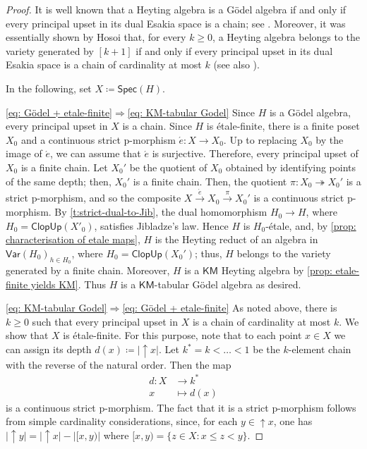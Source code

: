 \documentclass[12pt]{amsart}
\theoremstyle{plain}
\theoremstyle{definition}
\newcommand{\KM}{\mathsf{KM}}
\newcommand{\Spec}{\mathsf{Spec}}
\newcommand{\ClopUp}{\mathsf{ClopUp}}
\begin{document}
\begin{proof}
    It is well known that a Heyting algebra is a Gödel algebra if and only if every principal upset in its dual Esakia space is a chain; see \cite[Thm.~1.5]{hornlinearheyting}.
    Moreover, it was essentially shown by Hosoi \cite{Hosoi1967-HOSOIL-2} that, for every $k\geq 0$, a Heyting algebra belongs to the variety generated by $[k+1]$ if and only if every principal upset in its dual Esakia space is a chain of cardinality at most $k$ (see also \cite{Dunn1971}).

    In the following, set $X \coloneqq \Spec(H)$.

    \eqref{eq: Gödel + etale-finite}$\Rightarrow$\eqref{eq: KM-tabular Godel} Since $H$ is a Gödel algebra, every principal upset in $X$ is a chain. Since $H$ is étale-finite, there is a finite poset $X_{0}$ and a continuous strict p-morphism $\acute{e}\colon X\to X_{0}$.
    Up to replacing $X_0$ by the image of $\acute{e}$, we can assume that $\acute{e}$ is surjective.
    Therefore, every principal upset of $X_0$ is a finite chain.
    Let $X_0'$ be the quotient of $X_0$ obtained by identifying points of the same depth; then, $X_0'$ is a finite chain.
    Then, the quotient $\pi \colon X_0 \twoheadrightarrow X_0'$ is a strict p-morphism, and so the composite $X \xrightarrow{\acute{e}}X_0 \xrightarrow{\pi} X_0'$ is a continuous strict p-morphism.
    By \cref{t:strict-dual-to-Jib}, the dual homomorphism
    \(H_0\to H\), where $H_0 =\ClopUp(X'_0)$, satisfies Jibladze's law. Hence $H$ is
    $H_0$-étale, and, by \cref{prop: characterisation of etale maps}, $H$ is the Heyting reduct of an algebra in $\mathsf{Var}(H_{0})_{h\in H_0}$, where $H_{0}=\ClopUp(X_{0}')$; thus, $H$ belongs to the variety generated by a finite chain.  Moreover, $H$ is a $\KM$ Heyting algebra by \cref{prop: etale-finite yields KM}. Thus $H$ is a $\KM$-tabular Gödel algebra as desired.
    
    \eqref{eq: KM-tabular Godel}$\Rightarrow$\eqref{eq: Gödel + etale-finite} As noted above, there is $k \geq 0$ such that every principal upset in $X$ is a chain of cardinality at most $k$. We show that $X$ is étale-finite. For this purpose, note that to each point $x\in X$ we can assign its depth $d(x) \coloneqq \lvert {\uparrow}x\rvert$. Let $k^{*}=k<\dots<1$ be the $k$-element chain with the reverse of the natural order. Then the map
    \begin{align*}
        d\colon X&\longrightarrow k^{*}\\
        x&\longmapsto d(x)
    \end{align*}
    is a continuous strict p-morphism. The fact that it is a strict p-morphism follows from simple cardinality considerations, since, for each $y\in {\uparrow}x$, one has $\lvert{\uparrow}y\rvert=\lvert{\uparrow}x\rvert-\lvert [x,y)\rvert$ where $[x,y)=\{z\in X : x\leq z<y\}$. 
    

\end{proof}
\end{document}
